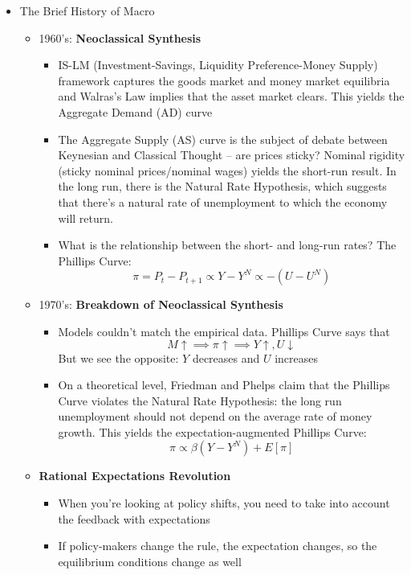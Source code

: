 \documentclass[12pt]{article}
\begin{document}
\begin{itemize}
\begin{itemize}
\begin{itemize}
        \end{itemize}
    \end{itemize}
    \item The Brief History of Macro
    \begin{itemize}
        \item 1960's: \textbf{Neoclassical Synthesis}
        \begin{itemize}
            \item IS-LM (Investment-Savings, Liquidity Preference-Money Supply) framework captures the goods market and money market equilibria and Walras's Law implies that the asset market clears. This yields the Aggregate Demand (AD) curve
            \item The Aggregate Supply (AS) curve is the subject of debate between Keynesian and Classical Thought -- are prices sticky? Nominal rigidity (sticky nominal prices/nominal wages) yields the short-run result. In the long run, there is the Natural Rate Hypothesis, which suggests that there's a natural rate of unemployment to which the economy will return.
            \item What is the relationship between the short- and long-run rates? The Phillips Curve:
            \[\pi = P_t - P_{t+1} \propto Y - Y^N \propto -(U - U^N)\]
        \end{itemize}
        \item 1970's: \textbf{Breakdown of Neoclassical Synthesis}
        \begin{itemize}
            \item Models couldn't match the empirical data. Phillips Curve says that 
            \[M \uparrow \implies \pi \uparrow \implies Y \uparrow, U \downarrow\]
            But we see the opposite: $Y$ decreases and $U$ increases
            \item On a theoretical level, Friedman and Phelps claim that the Phillips Curve violates the Natural Rate Hypothesis: the long run unemployment should not depend on the average rate of money growth. This yields the expectation-augmented Phillips Curve:
            \[\pi \propto \beta (Y - Y^N) + E[\pi]\]
        \end{itemize}
        \item \textbf{Rational Expectations Revolution}
        \begin{itemize}
            \item When you're looking at policy shifts, you need to take into account the feedback with expectations
            \item If policy-makers change the rule, the expectation changes, so the equilibrium conditions change as well

\end{itemize}
\end{itemize}
\end{itemize}
\end{document}
